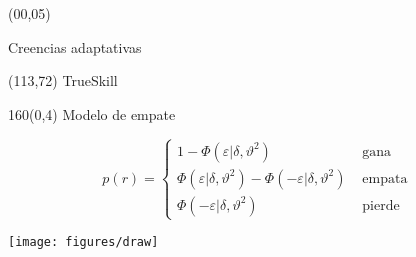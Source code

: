 \documentclass[shownotes,aspectratio=169]{beamer}
\begin{document}
\color{black!85}
\large
 


\begin{frame}
 
 \begin{textblock}{90}(00,05)
\begin{center}
 \huge  \textcolor{black!66}{Creencias adaptativas}
\end{center}

\begin{textblock}{47}(113,72)
\centering \Large  \textcolor{white!55}{TrueSkill} \ \ \ \ \ \
\end{textblock}

\end{textblock}

{}
\end{frame}



\begin{frame}[plain]
 \begin{textblock}{160}(0,4)
  \centering \Large Modelo de empate
 \end{textblock}
\vspace{1.25cm}
 
 \begin{equation*}
  p(r) = 
  \begin{cases}
   1 - \Phi(\varepsilon| \delta, \vartheta^2) & \text{ gana } \\
   \Phi(\varepsilon| \delta, \vartheta^2) - \Phi(-\varepsilon| \delta, \vartheta^2) & \text{ empata } \\
   \Phi(-\varepsilon| \delta, \vartheta^2) & \text{ pierde }
  \end{cases}
 \end{equation*}

 \vspace{0.5cm}

 \centering
\texttt{[image: figures/draw]}

 
\end{frame}
\end{document}
